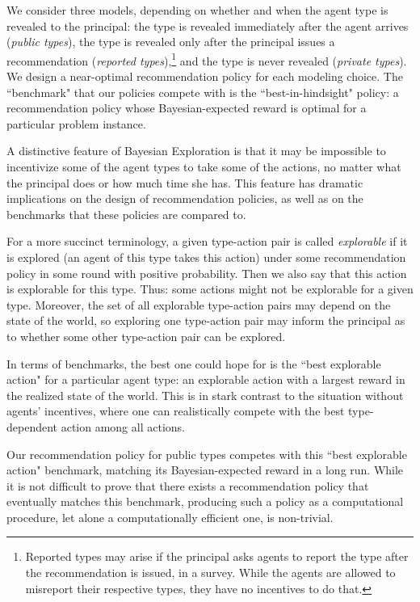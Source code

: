 We consider three models, depending on whether and when the agent type is revealed to the principal: the type is revealed immediately after the agent arrives (\emph{public types}), the type is revealed only after the principal issues a recommendation (\emph{reported types}),\footnote{Reported types may arise if 
the principal asks agents to report the type after the recommendation is issued, \eg in a survey. While the agents are allowed to misreport their respective types, they have no incentives to do that.} 
and the type is never revealed (\emph{private types}). 
%
We design a near-optimal recommendation policy for each modeling choice. The ``benchmark" that our policies compete with is the ``best-in-hindsight"
policy: a recommendation policy whose Bayesian-expected reward is optimal for a particular problem instance.  


A distinctive feature of Bayesian Exploration is that it may be impossible to incentivize some of the agent types to take some of the actions, no matter what the principal does or how much time she has. This feature has dramatic implications on the design of recommendation policies, as well as on the benchmarks that these policies are compared to.

For a more succinct terminology, a given type-action pair is called \emph{explorable} if it is explored (\ie an agent of this type takes this action) under some recommendation policy in some round with positive probability. Then we also say that this action is explorable for this type. Thus: some actions might not be explorable for a given type. Moreover, the set of all explorable type-action pairs may depend on the state of the world, so  exploring one type-action pair may inform the principal as to whether some other type-action pair can be explored.

In terms of benchmarks, the best one could hope for is the ``best explorable action" for a particular agent type: an explorable action with a largest reward in the realized state of the world. This is in stark contrast to the situation without agents' incentives, where one can realistically compete with the best type-dependent action among all actions.

Our recommendation policy for public types competes with this ``best explorable action" benchmark, matching its Bayesian-expected reward in a long run. While it is not difficult to prove that there exists a recommendation policy that eventually matches this benchmark, producing such a policy as a computational procedure, let alone a computationally efficient one, is non-trivial.


